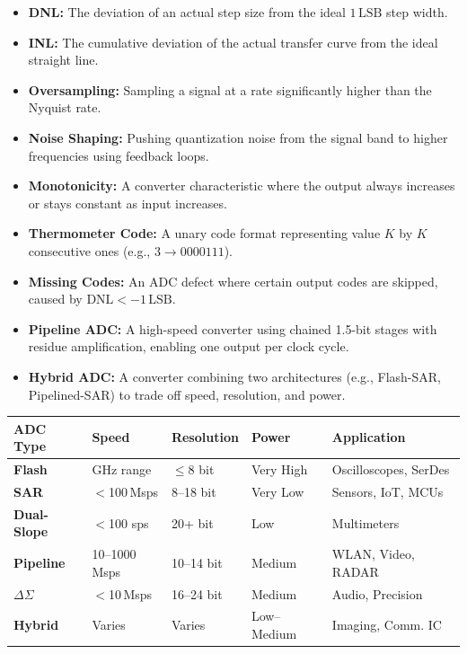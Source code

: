 \documentclass[12pt,a4paper]{article}
\renewcommand{\arraystretch}{1.45}
\begin{document}
\begin{tcolorbox}[defbox, title={\textbf{One-Line Definitions}}]
\begin{itemize}[leftmargin=*, itemsep=2pt, topsep=0pt]
  \item \textbf{DNL:} The deviation of an actual step size from the ideal $1\,\text{LSB}$ step width.
  \item \textbf{INL:} The cumulative deviation of the actual transfer curve from the ideal straight line.
  \item \textbf{Oversampling:} Sampling a signal at a rate significantly higher than the Nyquist rate.
  \item \textbf{Noise Shaping:} Pushing quantization noise from the signal band to higher frequencies using feedback loops.
  \item \textbf{Monotonicity:} A converter characteristic where the output always increases or stays constant as input increases.
  \item \textbf{Thermometer Code:} A unary code format representing value $K$ by $K$ consecutive ones (e.g., $3 \rightarrow 0000111$).
  \item \textbf{Missing Codes:} An ADC defect where certain output codes are skipped, caused by $\text{DNL} < -1\,\text{LSB}$.
  \item \textbf{Pipeline ADC:} A high-speed converter using chained 1.5-bit stages with residue amplification, enabling one output per clock cycle.
  \item \textbf{Hybrid ADC:} A converter combining two architectures (e.g., Flash-SAR, Pipelined-SAR) to trade off speed, resolution, and power.
\end{itemize}
\end{tcolorbox}

\begin{tcolorbox}[tikzbox, title={\textbf{ADC Architecture Comparison at a Glance}}]
\centering
\par\noindent
\renewcommand{\arraystretch}{1.25}
\begin{tabularx}{\linewidth}{|B{2.2cm}|Y|Y|Y|Y|}
\hline
\textbf{ADC Type} & \textbf{Speed} & \textbf{Resolution} & \textbf{Power} & \textbf{Application} \\ \hline
\textbf{Flash} & GHz range & $\leq$8 bit & Very High & Oscilloscopes, SerDes \\ \hline
\textbf{SAR} & $<$100\,Msps & 8--18 bit & Very Low & Sensors, IoT, MCUs \\ \hline
\textbf{Dual-Slope} & $<$100 sps & 20+ bit & Low & Multimeters \\ \hline
\textbf{Pipeline} & 10--1000\,Msps & 10--14 bit & Medium & WLAN, Video, RADAR \\ \hline
\textbf{$\Delta\Sigma$} & $<$10\,Msps & 16--24 bit & Medium & Audio, Precision \\ \hline
\textbf{Hybrid} & Varies & Varies & Low--Medium & Imaging, Comm. IC \\ \hline
\end{tabularx}
\end{tcolorbox}
\end{document}
